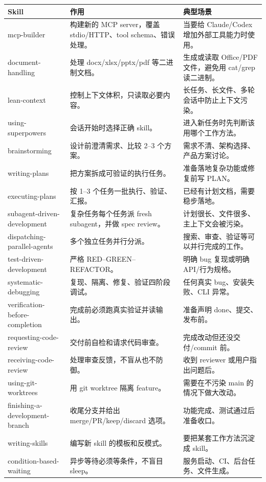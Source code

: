 \documentclass[11pt,a4paper]{ctexbook}
\begin{document}
\begin{longtable}{p{}p{}p{}}
\toprule
Skill & 作用 & 典型场景 \\
\midrule
mcp-builder & 构建新的 MCP server，覆盖 stdio/HTTP、tool schema、错误处理。 & 当要给 Claude/Codex 增加外部工具能力时使用。 \\
document-handling & 处理 docx/xlsx/pptx/pdf 等二进制文档。 & 生成或读取 Office/PDF 文件，避免用 cat/grep 读二进制。 \\
lean-context & 控制上下文体积，只读取必要内容。 & 长任务、长文件、多轮会话中防止上下文污染。 \\
using-superpowers & 会话开始时选择正确 skill。 & 进入新任务时先判断该用哪个工作方法。 \\
brainstorming & 设计前澄清需求、比较 2--3 个方案。 & 需求不清、架构选择、产品方案讨论。 \\
writing-plans & 把方案拆成可验证的执行任务。 & 准备落地复杂功能或修复前写 PLAN。 \\
executing-plans & 按 1--3 个任务一批执行、验证、汇报。 & 已经有计划文档，需要稳步落地。 \\
subagent-driven-development & 复杂任务每个任务派 fresh subagent，并做 spec review。 & 计划很长、文件很多、主上下文会被污染。 \\
dispatching-parallel-agents & 多个独立任务并行分派。 & 搜索、审查、验证等可以并行完成的工作。 \\
test-driven-development & 严格 RED--GREEN--REFACTOR。 & 明确 bug 复现或明确 API/行为规格。 \\
systematic-debugging & 复现、隔离、修复、验证四阶段调试。 & 任何真实 bug、安装失败、CLI 异常。 \\
verification-before-completion & 完成前必须跑真实验证并读输出。 & 准备声明 done、提交、发布前。 \\
requesting-code-review & 交付前自检和请求代码审查。 & 完成改动但还没交付/commit 前。 \\
receiving-code-review & 处理审查反馈，不盲从也不防御。 & 收到 reviewer 或用户指出问题后。 \\
using-git-worktrees & 用 git worktree 隔离 feature。 & 需要在不污染 main 的情况下做大改动。 \\
finishing-a-development-branch & 收尾分支并给出 merge/PR/keep/discard 选项。 & 功能完成、测试通过后准备收口。 \\
writing-skills & 编写新 skill 的模板和反模式。 & 要把某套工作方法沉淀成 skill。 \\
condition-based-waiting & 异步等待必须等条件，不盲目 sleep。 & 服务启动、CI、后台任务、文件生成。 \\

\end{longtable}
\end{document}

